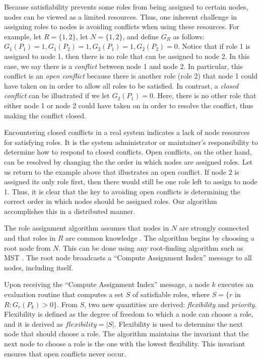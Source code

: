 \documentclass[11pt]{article}
\begin{document}
\begin{multicols}{2}
Because satisfiability prevents some roles from being assigned to certain nodes, nodes can be viewed as a limited resources. Thus, one inherent challenge in assigning roles to nodes is avoiding conflicts when using these resources. For example, let $R = \{1, 2\}$, let $N = \{1, 2\}$, and define $G_{R}$ as follows: $G_{1}(P_{1}) = 1, G_{1}(P_{2}) = 1, G_{2}(P_{1}) = 1, G_{2}(P_{2}) = 0$. Notice that if role 1 is assigned to node 1, then there is no role that can be assigned to node 2. In this case, we say there is a \textit{conflict} between node 1 and node 2. In particular, this conflict is an \textit{open conflict} because there is another role (role 2) that node 1 could have taken on in order to allow all roles to be satisfied. In contrast, a \textit{closed conflict} can be illustrated if we let $G_{2}(P_{1}) = 0$. Here, there is no other role that either node 1 or node 2 could have taken on in order to resolve the conflict, thus making the conflict closed.

Encountering closed conflicts in a real system indicates a lack of node resources for satisfying roles. It is the system administrator or maintainer's responsibility to determine how to respond to closed conflicts. Open conflicts, on the other hand, can be resolved by changing the the order in which nodes are assigned roles. Let us return to the example above that illustrates an open conflict. If node 2 is assigned its only role first, then there would still be one role left to assign to node 1. Thus, it is clear that the key to avoiding open conflicts is determining the correct order in which nodes should be assigned roles. Our algorithm accomplishes this in a distributed manner.

The role assignment algorithm assumes that nodes in $N$ are strongly connected and that roles in $R$ are common knowledge \cite{garg}. The algorithm begins by choosing a root node from $N$. This can be done using any root-finding algorithm such as MST \cite{MST}. The root node broadcasts a ``Compute Assignment Index'' message to all nodes, including itself.

Upon receiving the ``Compute Assignment Index'' message, a node $k$ executes an evaluation routine that computes a set $S$ of satisfiable roles, where $S = \{r$ in $R : G_{r}(P_{k}) > 0\}$. From $S$, two new quantities are derived: \textit{flexibility} and \textit{priority}. Flexibility is defined as the degree of freedom to which a node can choose a role, and it is derived as $flexibility = |S|$. Flexibility is used to determine the next node that should choose a role. The algorithm maintains the invariant that the next node to choose a role is the one with the lowest flexibility. This invariant ensures that open conflicts never occur.


\end{multicols}
\end{document}
